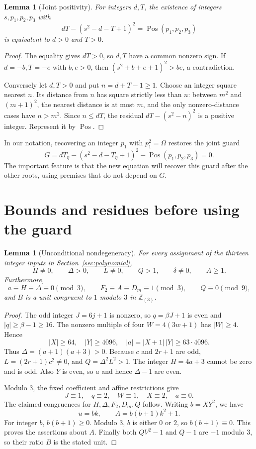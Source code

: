 \documentclass[11pt]{article}
\newtheorem{lemma}[theorem]{Lemma}
\theoremstyle{definition}
\theoremstyle{remark}
\newcommand{\Z}{\mathbb Z}
\newcommand{\Pos}{\operatorname{Pos}}
\begin{document}
\begin{lemma}[Joint positivity]\label{lem:joint}
For integers \(d,T\), the existence of integers \(s,p_1,p_2,p_3\) with
\[
 dT-(s^2-d-T+1)^2=\Pos(p_1,p_2,p_3)
\]
is equivalent to \(d>0\) and \(T>0\).
\end{lemma}
\begin{proof}
The equality gives \(dT>0\), so \(d,T\) have a common nonzero sign.
If \(d=-b,T=-e\) with \(b,e>0\), then
\((s^2+b+e+1)^2>be\), a contradiction.

Conversely let \(d,T>0\) and put \(n=d+T-1\ge1\). Choose an integer
square nearest \(n\). Its distance from \(n\) has square strictly less
than \(n\): between \(m^2\) and \((m+1)^2\), the nearest distance is at
most \(m\), and the only nonzero-distance cases have \(n>m^2\).
Since \(n\le dT\), the residual \(dT-(s^2-n)^2\) is a positive integer.
Represent it by \(\Pos\).
\end{proof}

In our notation, recovering an integer \(p_1\) with
\(p_1^2=\Omega\) restores the joint guard
\begin{equation}
 G=dT_\eta-(s^2-d-T_\eta+1)^2-\Pos(p_1,p_2,p_3)=0.
 \label{eq:G}
\end{equation}
The important feature is that the new equation will recover this guard
after the other roots, using premises that do not depend on \(G\).

\section{Bounds and residues before using the guard}
\label{sec:unconditional}

\begin{lemma}[Unconditional nondegeneracy]\label{lem:bounds}
For every assignment of the thirteen integer inputs in
Section~\ref{sec:polynomial},
\[
 H\ne0,\qquad \Delta>0,\qquad L\ne0,\qquad Q>1,\qquad \delta\ne0,
 \qquad A\ge1.
\]
Furthermore,
\[
 a\equiv H\equiv\Delta\equiv0\pmod3,\qquad
 F_2\equiv A\equiv D_m\equiv1\pmod3,\qquad Q\equiv0\pmod9,
\]
and \(B\) is a unit congruent to \(1\) modulo \(3\) in \(\Z_{(3)}\).
\end{lemma}
\begin{proof}
The odd integer \(J=6j+1\) is nonzero, so \(q=\beta J+1\) is even and
\(|q|\ge\beta-1\ge16\). The nonzero multiple of four
\(W=4(3w+1)\) has \(|W|\ge4\). Hence
\[
 |X|\ge64,\quad |Y|\ge4096,\quad
 |a|=|X+1|\,|Y|\ge63\cdot4096.
\]
Thus \(\Delta=(a+1)(a+3)>0\). Because \(c\) and \(2r+1\) are odd,
\(L=(2r+1)c^2\ne0\), and \(Q=\Delta^2L^2>1\).
The integer \(H=4a+3\) cannot be zero and is odd. Also \(Y\) is even,
so \(a\) and hence \(\Delta-1\) are even.

Modulo \(3\), the fixed coefficient and affine restrictions give
\[
 J\equiv1,\quad q\equiv2,\quad W\equiv1,\quad X\equiv2,\quad a\equiv0.
\]
The claimed congruences for \(H,\Delta,F_2,D_m,Q\) follow.
Writing \(b=XY^2\), we have
\[
 u=bk,\qquad A=b(b+1)k^2+1.
\]
For integer \(b\), \(b(b+1)\ge0\). Modulo \(3\), \(b\) is either \(0\)
or \(2\), so \(b(b+1)\equiv0\). This proves the assertions about \(A\).
Finally both \(QV^2-1\) and \(Q-1\) are \(-1\) modulo \(3\), so their
ratio \(B\) is the stated unit.
\end{proof}
\end{document}
